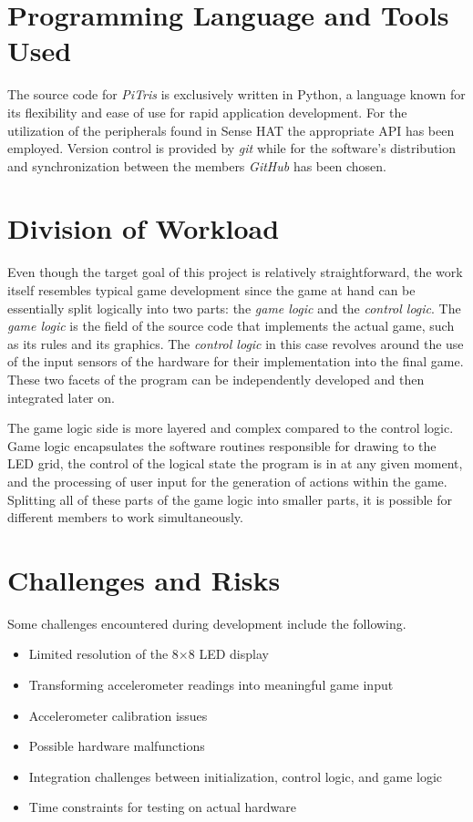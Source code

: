 \documentclass[11pt,titlepage,openright]{book}
\begin{document}
\section{Programming Language and Tools Used}
The source code for \textit{PiTris} is exclusively written in Python, a language known for its flexibility and ease of use for rapid application development. For the utilization of the peripherals found in Sense HAT the appropriate API has been employed. Version control is provided by \textit{git} while for the software's distribution and synchronization between the members \textit{GitHub} has been chosen.

\section{Division of Workload}
Even though the target goal of this project is relatively straightforward, the work itself resembles typical game development since the game at hand can be essentially split logically into two parts: the \textit{game logic} and the \textit{control logic}. The \textit{game logic} is the field of the source code that implements the actual game, such as its rules and its graphics. The \textit{control logic} in this case revolves around the use of the input sensors of the hardware for their implementation into the final game. These two facets of the program can be independently developed and then integrated later on.

The game logic side is more layered and complex compared to the control logic. Game logic encapsulates the software routines responsible for drawing to the LED grid, the control of the logical state the program is in at any given moment, and the processing of user input for the generation of actions within the game. Splitting all of these parts of the game logic into smaller parts, it is possible for different members to work simultaneously.



\section{Challenges and Risks}
Some challenges encountered during development include the following.

\begin{itemize}
    \item Limited resolution of the 8$\times$8 LED display
    \item Transforming accelerometer readings into meaningful game input
    \item Accelerometer calibration issues
    \item Possible hardware malfunctions
    \item Integration challenges between initialization, control logic, and game logic
    \item Time constraints for testing on actual hardware
\end{itemize}
\end{document}
